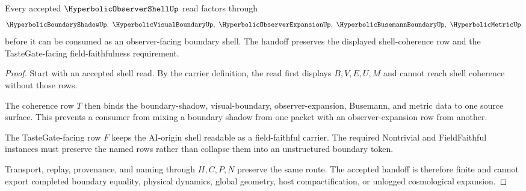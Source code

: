 \begin{theorem}
\label{thm:hyperbolic-observer-shell-boundary-handoff}
Every accepted $\HyperbolicObserverShellUp$ read factors through
$$
\HyperbolicBoundaryShadowUp,\ \HyperbolicVisualBoundaryUp,\ \HyperbolicObserverExpansionUp,\ \HyperbolicBusemannBoundaryUp,\ \HyperbolicMetricUp
$$
before it can be consumed as an observer-facing boundary shell. The handoff preserves the displayed shell-coherence row and the TasteGate-facing field-faithfulness requirement.
\end{theorem}
\begin{proof}
Start with an accepted shell read. By the carrier definition, the read first displays $B,V,E,U,M$ and cannot reach shell coherence without those rows.

The coherence row $T$ then binds the boundary-shadow, visual-boundary, observer-expansion, Busemann, and metric data to one source surface. This prevents a consumer from mixing a boundary shadow from one packet with an observer-expansion row from another.

The TasteGate-facing row $F$ keeps the AI-origin shell readable as a field-faithful carrier. The required Nontrivial and FieldFaithful instances must preserve the named rows rather than collapse them into an unstructured boundary token.

Transport, replay, provenance, and naming through $H,C,P,N$ preserve the same route. The accepted handoff is therefore finite and cannot export completed boundary equality, physical dynamics, global geometry, host compactification, or unlogged cosmological expansion.
\end{proof}



